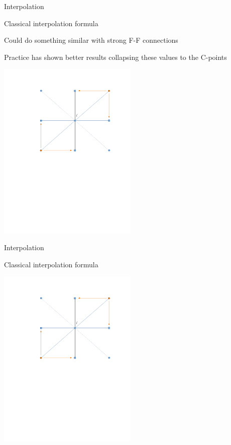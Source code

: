 \documentclass[18pt,xcolor=table]{beamer}
\begin{document}
\begin{frame}{Interpolation}
\begin{block}{Classical interpolation formula}
\bit
\item Could do something similar with strong F-F connections
\item Practice has shown better results collapsing these values to the C-points
\eit
\end{block}
\begin{center}
\includegraphics[width=0.5\textwidth]{../figures/interpStencilStrongF}
\end{center}
\end{frame}

\begin{frame}{Interpolation}
\begin{block}{Classical interpolation formula}
\end{block}
\begin{center}
\includegraphics[width=0.5\textwidth]{../figures/interpStencilStrongF}
\end{center}
\end{frame}
\end{document}
